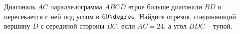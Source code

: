 \begin{ex}
	\begin{condition}
		Диагональ \( AC \) параллелограмма \( ABCD  \) втрое больше диагонали \( BD  \) и пересекается с ней под углом в \( 60\degree \). Найдите отрезок, соединяющий вершину \( D  \) с серединой стороны \( BC \), если \( AC = 24 \), а угол \( BDC \) – тупой.
	\end{condition}
\end{ex}